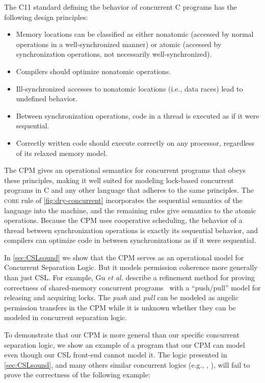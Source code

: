 The C11 standard defining the behavior of concurrent C programs has the following design principles:
\begin{itemize}
\item Memory locations can be classified as either nonatomic (accessed by normal operations in a well-synchronized manner) or atomic (accessed by synchronization operations, not necessarily well-synchronized).
\item Compilers should optimize nonatomic operations.
\item Ill-synchronized accesses to nonatomic locations (i.e., data races) lead to undefined behavior.
\item Between synchronization operations, code in a thread is executed as if it were sequential.
\item Correctly written code should execute correctly on any processor, regardless of its relaxed memory model.
\end{itemize}
The CPM gives an operational semantics for concurrent programs that obeys these principles, making it well suited for modeling lock-based concurrent programs in C and any other language that adheres to the same principles. The \textsc{core} rule of \cref{fig:dry-concurrent} incorporates the sequential semantics of the language into the machine, and the remaining rules give semantics to the atomic operations. Because the CPM uses cooperative scheduling, the behavior of a thread between synchronization operations is exactly its sequential behavior, and compilers can optimize code in between synchronizations as if it were sequential.

In \cref{sec:CSLsound} we show that
the CPM serves as an operational model for Concurrent Separation Logic.
But it models permission coherence more generally than just CSL.
For example, 
Gu \emph{et al.} describe a refinement method for proving
correctness of shared-memory concurrent programs~\cite{gu18:ccal}
with a ``push/pull'' model for releasing and acquiring locks.
The \emph{push} and \emph{pull} can be modeled as angelic permission
transfers in the CPM while it is unknown whether they can be modeled in concurrent separation logic.

To demonstrate that our CPM is more general than our specific concurrent separation logic,  
we show an example of a program that our CPM can model even though our CSL front-end cannot model it.
The logic presented in \cref{sec:CSLsound}, 
and many others similar concurrent logics (e.g., \cite{ohearn07:tcs}, \cite{hobor08:esop}), will fail to 
prove the correctness of the following example: 

